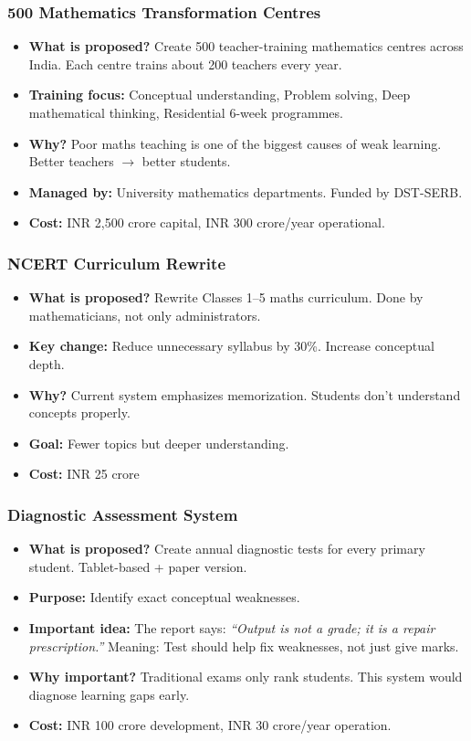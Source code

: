 \documentclass[12pt,a4paper]{article}
\begin{document}
\subsubsection{500 Mathematics Transformation Centres}
\begin{itemize}[leftmargin=*]
    \item \textbf{What is proposed?} Create 500 teacher-training mathematics centres across India. Each centre trains about 200 teachers every year.
    \item \textbf{Training focus:} Conceptual understanding, Problem solving, Deep mathematical thinking, Residential 6-week programmes.
    \item \textbf{Why?} Poor maths teaching is one of the biggest causes of weak learning. Better teachers $\rightarrow$ better students.
    \item \textbf{Managed by:} University mathematics departments. Funded by DST-SERB.
    \item \textbf{Cost:} INR 2,500 crore capital, INR 300 crore/year operational.
\end{itemize}

\subsubsection{NCERT Curriculum Rewrite}
\begin{itemize}[leftmargin=*]
    \item \textbf{What is proposed?} Rewrite Classes 1–5 maths curriculum. Done by mathematicians, not only administrators.
    \item \textbf{Key change:} Reduce unnecessary syllabus by 30\%. Increase conceptual depth.
    \item \textbf{Why?} Current system emphasizes memorization. Students don’t understand concepts properly.
    \item \textbf{Goal:} Fewer topics but deeper understanding.
    \item \textbf{Cost:} INR 25 crore
\end{itemize}

\subsubsection{Diagnostic Assessment System}
\begin{itemize}[leftmargin=*]
    \item \textbf{What is proposed?} Create annual diagnostic tests for every primary student. Tablet-based + paper version.
    \item \textbf{Purpose:} Identify exact conceptual weaknesses.
    \item \textbf{Important idea:} The report says: \textit{“Output is not a grade; it is a repair prescription.”} Meaning: Test should help fix weaknesses, not just give marks.
    \item \textbf{Why important?} Traditional exams only rank students. This system would diagnose learning gaps early.
    \item \textbf{Cost:} INR 100 crore development, INR 30 crore/year operation.
\end{itemize}
\end{document}
